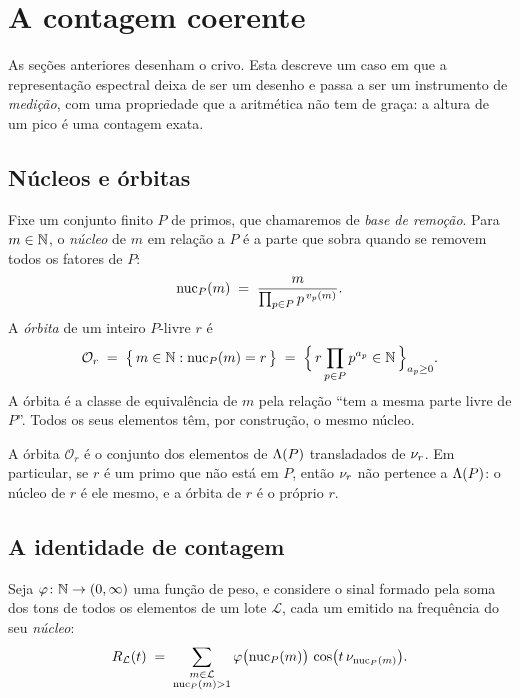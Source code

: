 \section{A contagem coerente}\label{sec:contagem}

As seções anteriores desenham o crivo. Esta descreve um caso em que a
representação espectral deixa de ser um desenho e passa a ser um instrumento de
\emph{medição}, com uma propriedade que a aritmética não tem de graça: a altura de
um pico é uma contagem exata.

\subsection{Núcleos e órbitas}

Fixe um conjunto finito $P$ de primos, que chamaremos de \emph{base de remoção}.
Para $m\in\mathbb{N}$, o \emph{núcleo} de $m$ em relação a $P$ é a parte que sobra quando
se removem todos os fatores de $P$:
\[
  \operatorname{nuc}_P(m) \;=\; \frac{m}{\prod_{p\in P}p^{\,v_p(m)}} .
\]
A \emph{órbita} de um inteiro $P$-livre $r$ é
\[
  \mathcal{O}_r \;=\; \bigl\{\,m\in\mathbb{N} : \operatorname{nuc}_P(m)=r\,\bigr\}
  \;=\; \Bigl\{\,r\prod_{p\in P}p^{a_p} \in \mathbb{N} \,\Bigr\}_{a_p\ge0} .
\]
A órbita é a classe de equivalência de $m$ pela relação ``tem a mesma parte livre
de $P$''. Todos os seus elementos têm, por construção, o mesmo núcleo.

\begin{observacao}\label{obs:orbita}
A órbita $\mathcal O_r$ é o conjunto dos elementos de $\Lambda(P)$ transladados de
$\nu_{r}$. Em particular, se $r$ é um primo que não está em $P$, então $\nu_{r}$
não pertence a $\Lambda(P)$: o núcleo de $r$ é ele mesmo, e a órbita de $r$ é o
próprio $r$.
\end{observacao}

\subsection{A identidade de contagem}

Seja $\varphi\colon\mathbb{N}\to(0,\infty)$ uma função de peso, e considere o sinal
formado pela soma dos tons de todos os elementos de um lote $\mathcal L$, cada um
emitido na frequência do seu \emph{núcleo}:
\begin{equation}\label{eq:colapsado}
  R_{\mathcal L}(t) \;=\;
  \sum_{\substack{m\in\mathcal L\\ \operatorname{nuc}_P(m)>1}}
  \varphi\bigl(\operatorname{nuc}_P(m)\bigr)\,\cos\bigl(t\,\nu_{\operatorname{nuc}_P(m)}\bigr) .
\end{equation}

